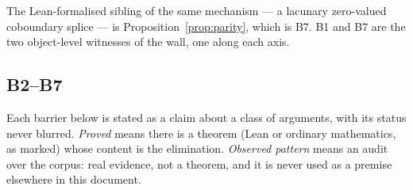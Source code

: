 \documentclass[11pt]{article}
\theoremstyle{plain}
\theoremstyle{definition}
\theoremstyle{remark}
\begin{document}
The Lean-formalised sibling of the same mechanism --- a lacunary zero-valued
coboundary splice --- is Proposition~\ref{prop:parity}, which is B7. B1 and B7
are the two object-level witnesses of the wall, one along each axis.

\subsection{B2--B7}

Each barrier below is stated as a claim about a class of arguments, with its
status never blurred. \emph{Proved} means there is a theorem (Lean or ordinary
mathematics, as marked) whose content is the elimination. \emph{Observed
pattern} means an audit over the corpus: real evidence, not a theorem, and it
is never used as a premise elsewhere in this document.
\end{document}
